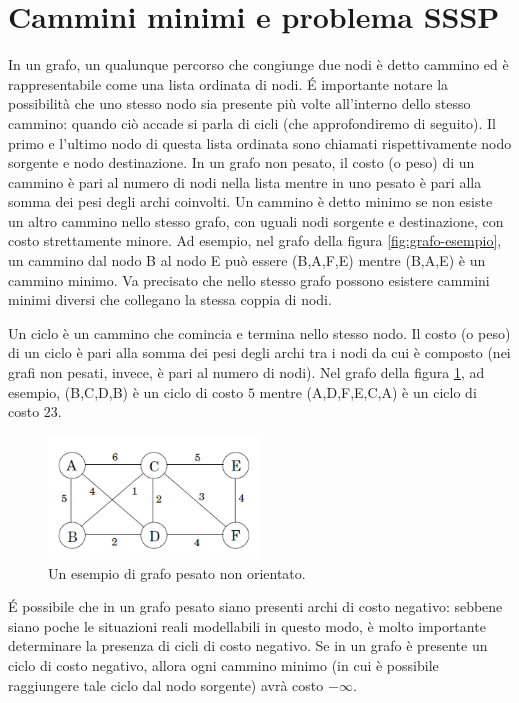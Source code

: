 \documentclass[12pt,a4paper,oneside]{book}
\begin{document}
	\section{Cammini minimi e problema SSSP}
	\label{section:sssp}
	In un grafo, un qualunque percorso che congiunge due nodi è detto cammino ed è rappresentabile come una lista ordinata di nodi. \'E importante notare la possibilità che uno stesso nodo sia presente più volte all'interno dello stesso cammino: quando ciò accade si parla di cicli (che approfondiremo di seguito). Il primo e l'ultimo nodo di questa lista ordinata sono chiamati rispettivamente nodo sorgente e nodo destinazione. In un grafo non pesato, il costo (o peso) di un cammino è pari al numero di nodi nella lista mentre in uno pesato è pari alla somma dei pesi degli archi coinvolti. Un cammino è detto minimo se non esiste un altro cammino nello stesso grafo, con uguali nodi sorgente e destinazione, con costo strettamente minore. Ad esempio, nel grafo della figura \ref{fig:grafo-esempio}, un cammino dal nodo B al nodo E può essere (B,A,F,E) mentre (B,A,E) è un cammino minimo. Va precisato che nello stesso grafo possono esistere cammini minimi diversi che collegano la stessa coppia di nodi.
	
	Un ciclo è un cammino che comincia e termina nello stesso nodo. Il costo (o peso) di un ciclo è pari alla somma dei pesi degli archi tra i nodi da cui è composto (nei grafi non pesati, invece, è pari al numero di nodi). Nel grafo della figura \ref{fig:grafo-esempio-2}, ad esempio, (B,C,D,B) è un ciclo di costo $5$ mentre (A,D,F,E,C,A) è un ciclo di costo $23$.
	\begin{figure}
		\centering
		\includegraphics[width=0.5\textwidth]{grafo-esempio-2}
		\caption{Un esempio di grafo pesato non orientato.}
		\label{fig:grafo-esempio-2}
	\end{figure}
	\'E possibile che in un grafo pesato siano presenti archi di costo negativo: sebbene siano poche le situazioni reali modellabili in questo modo, è molto importante determinare la presenza di cicli di costo negativo. Se in un grafo è presente un ciclo di costo negativo, allora ogni cammino minimo (in cui è possibile raggiungere tale ciclo dal nodo sorgente) avrà costo $-\infty$.
	
\end{document}
